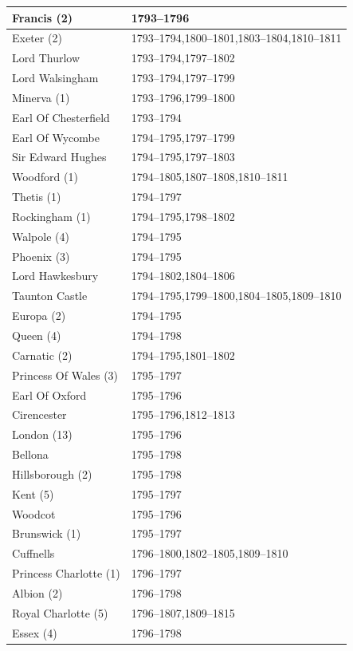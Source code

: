 \documentclass[CP]{copernicus}
\begin{document}
\begin{table}[!hbp]
\begin{minipage}[b]{0.5\linewidth}
{\begin{tabular}{|p{3.5cm}|p{3.5cm}|}
\hline
Francis (2) & 1793--1796\\
\hline
Exeter (2) & 1793--1794,1800--1801,1803--1804,1810--1811\\
\hline
Lord Thurlow & 1793--1794,1797--1802\\
\hline
Lord Walsingham & 1793--1794,1797--1799\\
\hline
Minerva (1) & 1793--1796,1799--1800\\
\hline
Earl Of Chesterfield & 1793--1794\\
\hline
Earl Of Wycombe & 1794--1795,1797--1799\\
\hline
Sir Edward Hughes & 1794--1795,1797--1803\\
\hline
Woodford (1) & 1794--1805,1807--1808,1810--1811\\
\hline
Thetis (1) & 1794--1797\\
\hline
Rockingham (1) & 1794--1795,1798--1802\\
\hline
Walpole (4) & 1794--1795\\
\hline
Phoenix (3) & 1794--1795\\
\hline
Lord Hawkesbury & 1794--1802,1804--1806\\
\hline
Taunton Castle & 1794--1795,1799--1800,1804--1805,1809--1810\\
\hline
Europa (2) & 1794--1795\\
\hline
Queen (4) & 1794--1798\\
\hline
Carnatic (2) & 1794--1795,1801--1802\\
\hline
Princess Of Wales (3) & 1795--1797\\
\hline
Earl Of Oxford & 1795--1796\\
\hline
Cirencester & 1795--1796,1812--1813\\
\hline
London (13) & 1795--1796\\
\hline
Bellona & 1795--1798\\
\hline
Hillsborough (2) & 1795--1798\\
\hline
Kent (5) & 1795--1797\\
\hline
Woodcot & 1795--1796\\
\hline
Brunswick (1) & 1795--1797\\
\hline
Cuffnells & 1796--1800,1802--1805,1809--1810\\
\hline
Princess Charlotte (1) & 1796--1797\\
\hline
Albion (2) & 1796--1798\\
\hline
Royal Charlotte (5) & 1796--1807,1809--1815\\
\hline
Essex (4) & 1796--1798\\

\end{tabular}}
\end{minipage}
\end{table}
\end{document}
